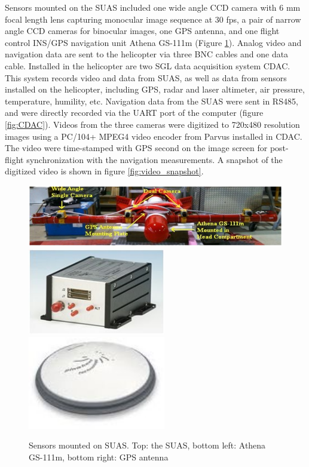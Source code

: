 Sensors mounted on the SUAS included one wide angle CCD camera with 6
mm focal length lens capturing monocular image sequence at 30 fps, a
pair of narrow angle CCD cameras for binocular images, one GPS
antenna, and one flight control INS/GPS navigation unit Athena GS-111m
\cite{_athena_????}(Figure \ref{fig:SUAS}). Analog video and
navigation data are sent to the helicopter via three BNC cables and
one data cable. Installed in the helicopter are two SGL data
acquisition system CDAC. This system records video and data from SUAS,
as well as data from sensors installed on the helicopter, including
GPS, radar and laser altimeter, air pressure, temperature, humility,
etc. Navigation data from the SUAS were sent in RS485, and were
directly recorded via the UART port of the computer (figure
\ref{fig:CDAC}). Videos from the three cameras were digitized to
720x480 resolution images using a PC/104+ MPEG4 video encoder from
Parvus installed in CDAC. The video were time-stamped with GPS second
on the image screen for post-flight synchronization with the
navigation measurements. A snapshot of the digitized video is shown in
figure \ref{fig:video_snapshot}.

\begin{figure}[h]
  \centering
  \includegraphics[width=14cm,keepaspectratio=true]{./Figures/SUAS.jpg}
  \includegraphics[width=6cm,keepaspectratio=true]{./Figures/athena.jpg}
  \includegraphics[width=6cm,keepaspectratio=true]{./Figures/GPS_antenna.jpg}
  \caption{Sensors mounted on SUAS. Top: the SUAS, bottom left: Athena
  GS-111m, bottom right: GPS antenna}
  \label{fig:SUAS}
\end{figure}

